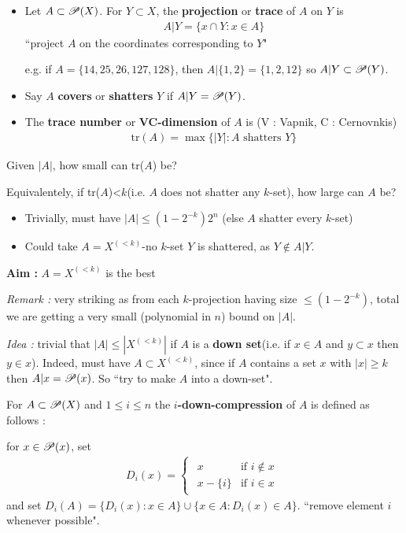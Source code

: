 \documentclass[12pt,a4paper]{report}
\newenvironment{proof}
{\begin{changemargin}{1cm}{0.5cm}
	}%
	{\end{changemargin}
}
\begin{document}
\begin{itemize}
\item Let $A\subset \P(X)$. For $Y\subset X$, the \textbf{projection} or \textbf{trace} of $A$ on $Y$ is
\begin{align*}
A| Y = \{x\cap Y : x\in A \}
\end{align*}
``project $A$ on the coordinates corresponding to $Y$"

e.g. if $A = \{14,25,26,127,128\}$, then $A |\{1,2\} = \{1,2,12\}$ so $A|Y \subset \P(Y)$.
\item Say $A$ \textbf{covers} or \textbf{shatters} $Y$ if $A|Y = \P(Y)$.
\item The \textbf{trace number} or \textbf{VC-dimension} of $A$ is (V : Vapnik, C : Cernovnkis)
\begin{align*}
\text{tr}(A) = \max \{|Y|: A \text{ shatters } Y \}
\end{align*}
\end{itemize}
\s

Given $|A|$, how small can tr($A$) be?

\quad Equivalentely, if tr($A$)<$k$(i.e. $A$ does not shatter any $k$-set), how large can $A$ be?
\begin{itemize}
\item Trivially, must have $|A| \leq (1-2^{-k})2^n$ (else $A$ shatter every $k$-set)
\item Could take $A= X^{(<k)}$-no $k$-set $Y$ is shattered, as $Y \not\in A|Y$.
\end{itemize}
\s

\textbf{Aim :} $A = X^{(<k)}$ is the best
\s

\textit{Remark :} very striking as from each $k$-projection having size $\leq(1-2^{-k})$, total we are getting a very small (polynomial in $n$) bound on $|A|$.
\s

\textit{Idea :} trivial that $|A| \leq |X^{(<k)}|$ if $A$ is a \textbf{down set}(i.e. if $x\in A$ and $y\subset x$ then $y\in x$). Indeed, must have $A\subset X^{(<k)}$, since if $A$ contains a set $x$ with $|x|\geq k$ then $A|x = \P (x)$. So ``try to make $A$ into a down-set".
\s

For $A \subset \P(X)$ and $1\leq i\leq n$ the \textbf{$i$-down-compression} of $A$ is defined as follows :
\begin{proof}
for $x\in \P(x)$, set
\begin{align*}
D_i(x) = \begin{cases}
\begin{array}{ll}
x & \text{if } i \not\in x \\
x- \{i\} & \text{if } i\in x
\end{array}
\end{cases}
\end{align*}
and set $D_i(A) = \{D_i(x) : x\in A \} \cup \{x\in A : D_i(x)\in A\}$. ``remove element $i$ whenever possible".
\end{proof}
\s
\end{document}
